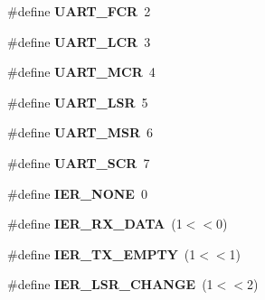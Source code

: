 \begin{DoxyCompactItemize}
\item 
\hypertarget{group__hal__dos_ga220a678f91ca8244b30fe813200c26c1}{\#define {\bfseries U\-A\-R\-T\-\_\-\-F\-C\-R}~2}\label{group__hal__dos_ga220a678f91ca8244b30fe813200c26c1}

\item 
\hypertarget{group__hal__dos_ga36c30861e332468c7f1998648e706740}{\#define {\bfseries U\-A\-R\-T\-\_\-\-L\-C\-R}~3}\label{group__hal__dos_ga36c30861e332468c7f1998648e706740}

\item 
\hypertarget{group__hal__dos_ga8ef39bc0942ddd0411d87001d12224f4}{\#define {\bfseries U\-A\-R\-T\-\_\-\-M\-C\-R}~4}\label{group__hal__dos_ga8ef39bc0942ddd0411d87001d12224f4}

\item 
\hypertarget{group__hal__dos_ga0f8ac527073d763bac90daba987361c6}{\#define {\bfseries U\-A\-R\-T\-\_\-\-L\-S\-R}~5}\label{group__hal__dos_ga0f8ac527073d763bac90daba987361c6}

\item 
\hypertarget{group__hal__dos_ga71067c48bdde7dc6c5d0a1c56746e776}{\#define {\bfseries U\-A\-R\-T\-\_\-\-M\-S\-R}~6}\label{group__hal__dos_ga71067c48bdde7dc6c5d0a1c56746e776}

\item 
\hypertarget{group__hal__dos_ga0aca402a154875f36d38e4ebc5c8f043}{\#define {\bfseries U\-A\-R\-T\-\_\-\-S\-C\-R}~7}\label{group__hal__dos_ga0aca402a154875f36d38e4ebc5c8f043}

\item 
\hypertarget{group__hal__dos_ga2c43b3d54061de2d1a40c11a0dc36d99}{\#define {\bfseries I\-E\-R\-\_\-\-N\-O\-N\-E}~0}\label{group__hal__dos_ga2c43b3d54061de2d1a40c11a0dc36d99}

\item 
\hypertarget{group__hal__dos_ga06339c8fac453ce9078d90d59d1d5833}{\#define {\bfseries I\-E\-R\-\_\-\-R\-X\-\_\-\-D\-A\-T\-A}~(1$<$$<$0)}\label{group__hal__dos_ga06339c8fac453ce9078d90d59d1d5833}

\item 
\hypertarget{group__hal__dos_ga3b5355c5845bf4e5f9900dae4977fc65}{\#define {\bfseries I\-E\-R\-\_\-\-T\-X\-\_\-\-E\-M\-P\-T\-Y}~(1$<$$<$1)}\label{group__hal__dos_ga3b5355c5845bf4e5f9900dae4977fc65}

\item 
\hypertarget{group__hal__dos_ga8fdda855b9a7ec12dccdb44f0e985af5}{\#define {\bfseries I\-E\-R\-\_\-\-L\-S\-R\-\_\-\-C\-H\-A\-N\-G\-E}~(1$<$$<$2)}\label{group__hal__dos_ga8fdda855b9a7ec12dccdb44f0e985af5}


\end{DoxyCompactItemize}
